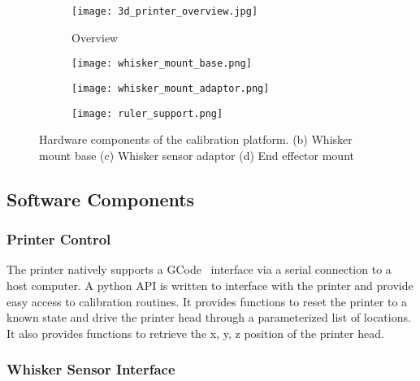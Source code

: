 \documentclass[runningheads]{llncs}
\begin{document}
\begin{figure}
    \begin{subfigure}{.245\columnwidth}
        \centering
        \texttt{[image: 3d\_printer\_overview.jpg]}
        \caption{Overview}
        \label{fig:calibration_rig_overview}
    \end{subfigure}
    \begin{subfigure}{.245\columnwidth}
    \centering
    \texttt{[image: whisker\_mount\_base.png]}
        \caption{}
        \label{fig:whisker_mount_base}
    \end{subfigure}
    \begin{subfigure}{.245\columnwidth}
        \centering
        \texttt{[image: whisker\_mount\_adaptor.png]}
        \caption{}
        \label{fig:whisker_mount_adaptor}
    \end{subfigure}
    \begin{subfigure}{.245\columnwidth}
        \centering
        \texttt{[image: ruler\_support.png]}
        \caption{}
        \label{fig:beam_monunt}
    \end{subfigure}
    \caption{Hardware components of the calibration platform. (b) Whisker mount base (c) Whisker sensor adaptor (d) End effector mount}
    \label{fig:calibration_rig}
\end{figure}

\subsection{Software Components}

\subsubsection{Printer Control}

The printer natively supports a GCode~\cite{kramerNISTRS274NGCInterpreter2000} interface via a serial connection to a host computer. A python API is written to interface with the printer and provide easy access to calibration routines. It provides functions to reset the printer to a known state and drive the printer head through a parameterized list of locations. It also provides functions to retrieve the x, y, z position of the printer head.

\subsubsection{Whisker Sensor Interface}
\end{document}
